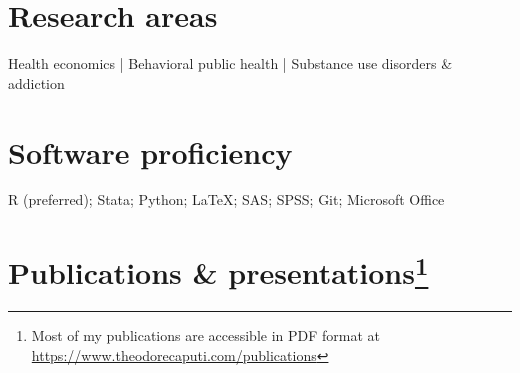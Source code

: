 \documentclass[10pt, letterpaper]{article}
\begin{document}
\section*{Research areas}
Health economics | Behavioral public health | Substance use disorders \& addiction

\section*{Software proficiency}
 R (preferred); Stata; Python; \LaTeX; SAS; SPSS; Git; Microsoft Office


\clearpage

\section*{Publications \& presentations\footnote{Most of my publications are accessible in PDF format at \href{https://www.theodorecaputi.com/publications}{https://www.theodorecaputi.com/publications}}}
\end{document}
